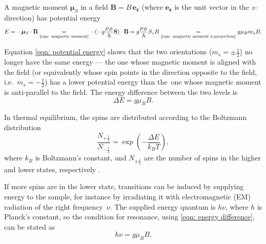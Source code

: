 \documentclass[a4paper]{jpconf}
\numberwithin{equation}{section}
\begin{document}
A magnetic moment $\bm{\mu}_S$ in a field $\mathbf{B} = B \, \mathbf{e_z}$ (where $\mathbf{e_z}$ is the unit vector in the $z$-direction) has potential energy
\begin{equation}
	E = - \bm{\mu}_S \cdot \mathbf{B} \underset{\text{\eqref{eqn: magnetic moment}}}{=}  - (- g \frac{\mu_B}{\hbar} \mathbf{S})\cdot\mathbf{B}
	  = g \frac{\mu_B}{\hbar}S_z B 
	  \underset{\text{\eqref{eqn: magnetic moment z-projection}}}{=} g\mu_Bm_sB \label{eqn: potential energy}.
\end{equation}

Equation \eqref{eqn: potential energy} shows that the two orientations ($m_s = \pm\tfrac12$) no longer have the same energy --- the one whose magnetic moment is aligned with the field (or equivalently whose spin points in the direction opposite to the field, i.e.\ $m_s = -\tfrac12$) has a lower potential energy than the~one whose magnetic moment is anti-parallel to the field. The energy difference between the two levels is 
\begin{equation}
	\Delta E = g \mu_B B. \label{eqn: energy difference}
\end{equation}

In thermal equilibrium, the spins are distributed according to the Boltzmann distribution
\[
    \frac{N_{+\tfrac12}}{N_{-\tfrac12}} = \exp(- \frac{\Delta E}{k_B T}),
\]
where $k_B$ is Boltzmann\textquoteright s constant, and $N_{\pm\tfrac12}$ are the number of spins in the higher and lower states, respectively \cite{Gero}. 

If more spins are in the lower state, transitions can be induced by supplying energy to the sample, for instance by irradiating it with electromagnetic (EM) radiation of the right frequency~$\nu$. The supplied energy quantum is $h \nu$, where $h$ is Planck's constant, so the condition for resonance, using \eqref{eqn: energy difference}, can be stated as
\begin{equation}
	h\nu = g\mu_B B. \label{eqn: resonance condition}
\end{equation}
\end{document}
